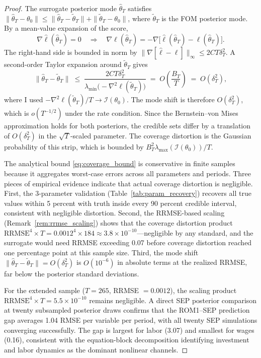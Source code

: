 \documentclass[12pt]{article}
\theoremstyle{plain}
\theoremstyle{definition}
\theoremstyle{remark}
\begin{document}
\begin{proof}
The surrogate posterior mode $\hat{\theta}_T$ satisfies $\|\hat{\theta}_T - \theta_0\| \leq \|\hat{\theta}_T - \tilde{\theta}_T\| + \|\tilde{\theta}_T - \theta_0\|$, where $\tilde{\theta}_T$ is the FOM posterior mode. By a mean-value expansion of the score,
\[
\nabla \hat{\ell}(\hat{\theta}_T) = 0
\quad\Longrightarrow\quad
\nabla \ell(\hat{\theta}_T)
  = -\nabla\bigl[\hat{\ell}(\hat{\theta}_T) - \ell(\hat{\theta}_T)\bigr].
\]
The right-hand side is bounded in norm by $\|\nabla[\hat{\ell} - \ell]\|_\infty \leq 2CT\delta_T^2$. A second-order Taylor expansion around $\tilde{\theta}_T$ gives
\[
\|\hat{\theta}_T - \tilde{\theta}_T\|
  \;\leq\; \frac{2CT\delta_T^2}
    {\lambda_{\min}\!\bigl(-\nabla^2\ell(\tilde{\theta}_T)\bigr)}
  \;=\; O\!\left(\frac{B_T}{T}\right)
  \;=\; O(\delta_T^2),
\]
where I used $-\nabla^2\ell(\tilde{\theta}_T)/T \to \mathcal{I}(\theta_0)$. The mode shift is therefore $O(\delta_T^2)$, which is $o(T^{-1/2})$ under the rate condition. Since the Bernstein--von Mises approximation holds for both posteriors, the credible sets differ by a translation of $O(\delta_T^2)$ in the $\sqrt{T}$-scaled parameter. The coverage distortion is the Gaussian probability of this strip, which is bounded by $B_T^2 \lambda_{\max}(\mathcal{I}(\theta_0)) / T$.

The analytical bound \eqref{eq:coverage_bound} is conservative in finite samples because it aggregates worst-case errors across all parameters and periods. Three pieces of empirical evidence indicate that actual coverage distortion is negligible. First, the 3-parameter validation (Table~\ref{tab:param_recovery}) recovers all true values within 5 percent with truth inside every 90 percent credible interval, consistent with negligible distortion. Second, the RRMSE-based scaling (Remark~\ref{rem:rrmse_scaling}) shows that the coverage distortion product $\text{RRMSE}^4 \times T = 0.0012^4 \times 184 \approx 3.8 \times 10^{-10}$---negligible by any standard, and the surrogate would need RRMSE exceeding 0.07 before coverage distortion reached one percentage point at this sample size. Third, the mode shift $\|\hat{\theta}_T - \tilde{\theta}_T\| = O(\delta_T^2)$ is $O(10^{-6})$ in absolute terms at the realized RRMSE, far below the posterior standard deviations.

For the extended sample ($T = 265$, RRMSE $= 0.0012$), the scaling product $\text{RRMSE}^4 \times T = 5.5 \times 10^{-10}$ remains negligible. A direct SEP posterior comparison at twenty subsampled posterior draws confirms that the ROM1--SEP prediction gap averages 1.04 RMSE per variable per period, with all twenty SEP simulations converging successfully. The gap is largest for labor (3.07) and smallest for wages (0.16), consistent with the equation-block decomposition identifying investment and labor dynamics as the dominant nonlinear channels.
\end{proof}
\end{document}
